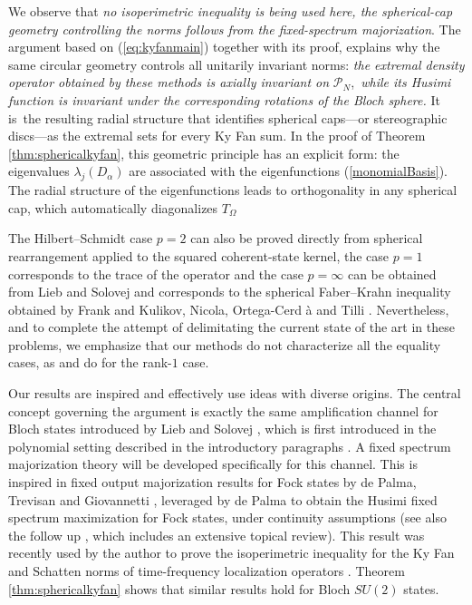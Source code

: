 \documentclass[12pt]{amsart}
\theoremstyle{plain}
\theoremstyle{definition}
\theoremstyle{remark}
\numberwithin{equation}{section}
\newcommand{\1}{\mathbf 1}
\begin{document}
We observe that \emph{no isoperimetric inequality is being used here, the
spherical-cap geometry controlling the norms follows from the fixed-spectrum majorization}.
The argument based on (\ref{eq:kyfanmain}) together with its proof, explains
why the same circular geometry controls all unitarily invariant norms: \emph{the extremal density operator obtained by these
methods is axially invariant on }$\mathcal{P}_{N}$,\emph{\ while its Husimi
function is invariant under the corresponding rotations of the Bloch sphere. 
}It is\emph{\ }the resulting radial structure that identifies spherical
caps---or stereographic discs---as the extremal sets for every Ky Fan sum.
In the proof of Theorem \ref{thm:sphericalkyfan}, this geometric principle
has an explicit form: the eigenvalues $\lambda _{j}(D_{\alpha })$ are
associated with the eigenfunctions (\ref{monomialBasis}). The radial
structure of the eigenfunctions leads to orthogonality in any spherical cap,
which automatically diagonalizes $T_{\Omega }$

The Hilbert--Schmidt case $p=2$ can also be proved directly from spherical
rearrangement applied to the squared coherent-state kernel, the case $p=1$
corresponds to the trace of the operator and the case $p=\infty $ can be
obtained from Lieb and Solovej and corresponds to the spherical Faber--Krahn
inequality obtained by Frank \cite{Frank} and Kulikov, Nicola, Ortega-Cerd%
\`{a} and Tilli \cite{Frank,KNOT}. Nevertheless, and to complete the attempt
of delimitating the current state of the art in these problems, we emphasize
that our methods do not characterize all the equality cases, as \cite{Frank}
and \cite{Frank,KNOT} do for the rank-$1$ case. 

Our results are inspired and effectively use ideas with diverse origins. The
central concept governing the argument is exactly the same amplification
channel for Bloch states introduced by Lieb and Solovej \cite[Theorems~2.1]%
{LiebSolovej}, which is first introduced in the polynomial setting
described in the introductory paragraphs . A fixed spectrum majorization
theory will be developed specifically for this channel. This is
inspired in fixed output majorization results for Fock states by de Palma,
Trevisan and Giovannetti \cite{DPTG}, leveraged by de Palma \cite%
{DePalma2018} to obtain the Husimi fixed spectrum maximization for Fock
states, under continuity assumptions (see also the follow up \cite{DPTGA},
which includes an extensive topical review). This result was recently
used by the author to prove the isoperimetric inequality for the Ky Fan and
Schatten norms of time-frequency localization operators \cite{AbreuKyFan}.
Theorem \ref{thm:sphericalkyfan} shows that similar results hold for Bloch $SU(2)$ states. 
\end{document}

